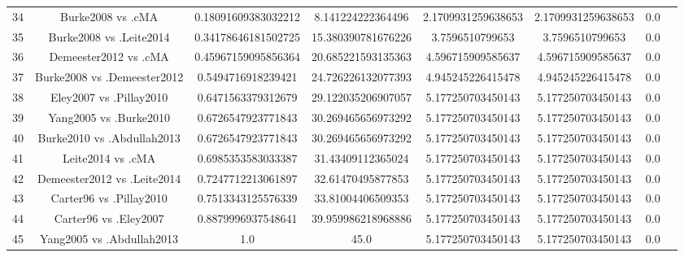 \documentclass[a4paper,10pt]{article}
\begin{document}
\begin{landscape}
\begin{table}[!htp]
\begin{tabular}{cccccccc}
34&Burke2008 vs .cMA&0.18091609383032212&8.141224222364496&2.1709931259638653&2.1709931259638653&0.0\\
35&Burke2008 vs .Leite2014&0.34178646181502725&15.380390781676226&3.7596510799653&3.7596510799653&0.0\\
36&Demeester2012 vs .cMA&0.45967159095856364&20.685221593135363&4.596715909585637&4.596715909585637&0.0\\
37&Burke2008 vs .Demeester2012&0.5494716918239421&24.726226132077393&4.945245226415478&4.945245226415478&0.0\\
38&Eley2007 vs .Pillay2010&0.6471563379312679&29.122035206907057&5.177250703450143&5.177250703450143&0.0\\
39&Yang2005 vs .Burke2010&0.6726547923771843&30.269465656973292&5.177250703450143&5.177250703450143&0.0\\
40&Burke2010 vs .Abdullah2013&0.6726547923771843&30.269465656973292&5.177250703450143&5.177250703450143&0.0\\
41&Leite2014 vs .cMA&0.6985353583033387&31.43409112365024&5.177250703450143&5.177250703450143&0.0\\
42&Demeester2012 vs .Leite2014&0.7247712213061897&32.61470495877853&5.177250703450143&5.177250703450143&0.0\\
43&Carter96 vs .Pillay2010&0.7513343125576339&33.81004406509353&5.177250703450143&5.177250703450143&0.0\\
44&Carter96 vs .Eley2007&0.8879996937548641&39.959986218968886&5.177250703450143&5.177250703450143&0.0\\
45&Yang2005 vs .Abdullah2013&1.0&45.0&5.177250703450143&5.177250703450143&0.0\\
\hline
\end{tabular}
\end{table}

\end{landscape}
\end{document}
